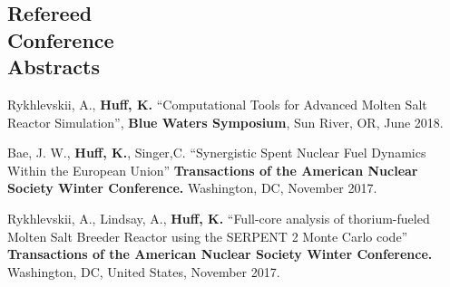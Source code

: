 \documentclass[margin,line]{resume}
\begin{document}
\begin{resume}

    \section{\mysidestyle Refereed\\Conference\\Abstracts}
    \begin{bibenum} 
    \item Rykhlevskii, A., \textbf{Huff, K.} ``Computational Tools for Advanced 
            Molten Salt Reactor Simulation'', \textbf{Blue Waters Symposium}, 
            Sun River, OR, June 2018.
    \item Bae, J. W., \textbf{Huff, K.}, Singer,C. ``Synergistic Spent Nuclear Fuel Dynamics Within the European Union'' 
            \textbf{Transactions of the American Nuclear Society Winter Conference.} 
            Washington, DC, November 2017.  
    \item Rykhlevskii, A., Lindsay, A., \textbf{Huff, K.} ``Full-core analysis of thorium-fueled Molten Salt Breeder Reactor using the SERPENT 2 Monte Carlo code'' 
            \textbf{Transactions of the American Nuclear Society Winter Conference.} 
            Washington, DC, United States, November 2017.
    \end{bibenum}
      

\end{resume}
\end{document}
